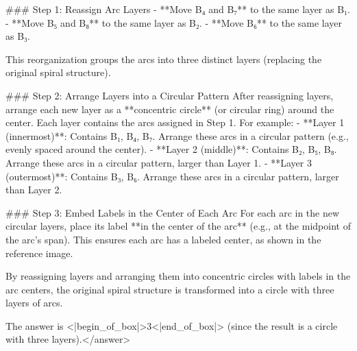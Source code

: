 ### Step 1: Reassign Arc Layers  
- **Move B₄ and B₇** to the same layer as B₁.  
- **Move B₅ and B₈** to the same layer as B₂.  
- **Move B₆** to the same layer as B₃.  

This reorganization groups the arcs into three distinct layers (replacing the original spiral structure).  


### Step 2: Arrange Layers into a Circular Pattern  
After reassigning layers, arrange each new layer as a **concentric circle** (or circular ring) around the center. Each layer contains the arcs assigned in Step 1. For example:  
- **Layer 1 (innermost)**: Contains B₁, B₄, B₇. Arrange these arcs in a circular pattern (e.g., evenly spaced around the center).  
- **Layer 2 (middle)**: Contains B₂, B₅, B₈. Arrange these arcs in a circular pattern, larger than Layer 1.  
- **Layer 3 (outermost)**: Contains B₃, B₆. Arrange these arcs in a circular pattern, larger than Layer 2.  


### Step 3: Embed Labels in the Center of Each Arc  
For each arc in the new circular layers, place its label **in the center of the arc** (e.g., at the midpoint of the arc’s span). This ensures each arc has a labeled center, as shown in the reference image.  


By reassigning layers and arranging them into concentric circles with labels in the arc centers, the original spiral structure is transformed into a circle with three layers of arcs.  

The answer is <|begin_of_box|>3<|end_of_box|> (since the result is a circle with three layers).</answer>
